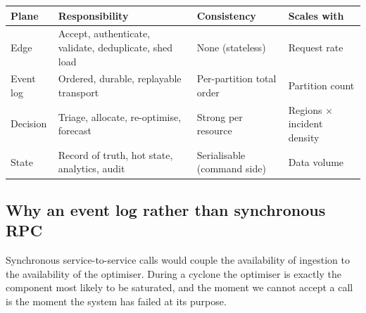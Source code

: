 \documentclass[11pt,a4paper]{article}
\begin{document}
\begin{center}
\end{center}

\begin{center}\footnotesize
\begin{tabular}{@{}p{26mm}p{42mm}p{38mm}p{38mm}@{}}
\toprule
\textbf{Plane} & \textbf{Responsibility} & \textbf{Consistency} & \textbf{Scales with} \\
\midrule
Edge & Accept, authenticate, validate, deduplicate, shed load & None (stateless) & Request rate \\
Event log & Ordered, durable, replayable transport & Per-partition total order & Partition count \\
Decision & Triage, allocate, re-optimise, forecast & Strong per resource & Regions $\times$ incident density \\
State & Record of truth, hot state, analytics, audit & Serialisable (command side) & Data volume \\
\bottomrule
\end{tabular}
\end{center}

\subsection{Why an event log rather than synchronous RPC}

Synchronous service-to-service calls would couple the availability of
ingestion to the availability of the optimiser. During a cyclone the optimiser
is exactly the component most likely to be saturated, and the moment we cannot
accept a call is the moment the system has failed at its purpose.
\end{document}
